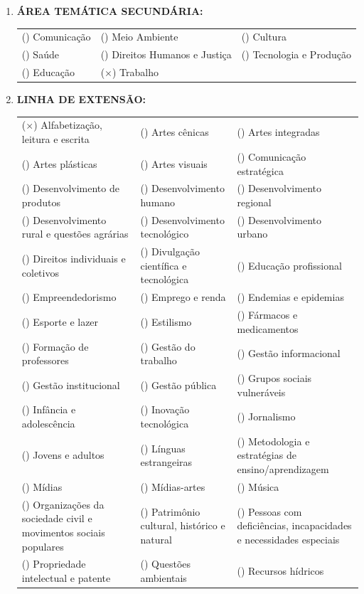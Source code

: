 \documentclass[12pt,a4paper,oneside]{article}%
\begin{document}
\begin{enumerate}
\begin{tabularx}{\linewidth}{|X|X|X|}
\hline%
\end{tabularx}%
\item%
\textbf{ÁREA TEMÁTICA SECUNDÁRIA: }%
\newline%
\begin{tabularx}{\linewidth}{|X|X|X|}%
\hline%
() Comunicação&() Meio Ambiente&() Cultura\\%
() Saúde&() Direitos Humanos e Justiça&() Tecnologia e Produção\\%
() Educação&($\times$) Trabalho&\\%
\hline%
\end{tabularx}%
\newpage%
\item%
\textbf{LINHA DE EXTENSÃO: }%
\newline%
\newline%
{\tiny%
\begin{tabularx}{\linewidth}{X|X|X}%
($\times$) Alfabetização, leitura e escrita&() Artes cênicas&() Artes integradas\\%
() Artes plásticas&() Artes visuais&() Comunicação estratégica\\%
() Desenvolvimento de produtos&() Desenvolvimento humano&() Desenvolvimento regional\\%
() Desenvolvimento rural e questões agrárias&() Desenvolvimento tecnológico&() Desenvolvimento urbano\\%
() Direitos individuais e coletivos&() Divulgação científica e tecnológica&() Educação profissional\\%
() Empreendedorismo&() Emprego e renda&() Endemias e epidemias\\%
() Esporte e lazer&() Estilismo&() Fármacos e medicamentos\\%
() Formação de professores&() Gestão do trabalho&() Gestão informacional\\%
() Gestão institucional&() Gestão pública&() Grupos sociais vulneráveis\\%
() Infância e adolescência&() Inovação tecnológica&() Jornalismo\\%
() Jovens e adultos&() Línguas estrangeiras&() Metodologia e estratégias de ensino/aprendizagem\\%
() Mídias&() Mídias{-}artes&() Música\\%
() Organizações da sociedade civil e movimentos sociais populares&() Patrimônio cultural, histórico e natural&() Pessoas com deficiências, incapacidades e necessidades especiais\\%
() Propriedade intelectual e patente&() Questões ambientais&() Recursos hídricos\\%

\end{tabularx}}
\end{enumerate}
\end{document}
